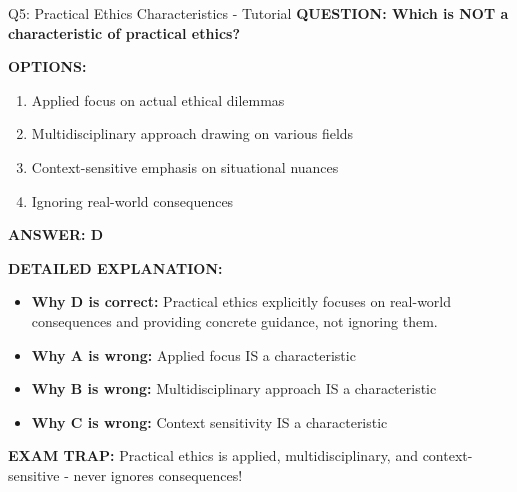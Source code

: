 \documentclass[8pt]{beamer}
\begin{document}
	\begin{frame}{Q5: Practical Ethics Characteristics - Tutorial}
		\fontsize{6.5}{7.5}\selectfont
		\textbf{QUESTION: Which is NOT a characteristic of practical ethics?}
		
		\vspace{0.1cm}
		\textbf{OPTIONS:}
		\begin{enumerate}
			\item Applied focus on actual ethical dilemmas
			\item Multidisciplinary approach drawing on various fields
			\item Context-sensitive emphasis on situational nuances
			\item Ignoring real-world consequences
		\end{enumerate}
		
		\vspace{0.1cm}
		\textcolor{myblue}{\textbf{ANSWER: D}}
		
		\vspace{0.1cm}
		\textbf{DETAILED EXPLANATION:}
		\begin{itemize}
			\item \textbf{Why D is correct:} Practical ethics explicitly focuses on real-world consequences and providing concrete guidance, not ignoring them.
			\item \textbf{Why A is wrong:} Applied focus IS a characteristic
			\item \textbf{Why B is wrong:} Multidisciplinary approach IS a characteristic
			\item \textbf{Why C is wrong:} Context sensitivity IS a characteristic
		\end{itemize}
		
		\textcolor{myred}{\textbf{EXAM TRAP:}} Practical ethics is \textcolor{myblue}{applied, multidisciplinary, and context-sensitive} - never ignores consequences!
	\end{frame}
	
	
\end{document}
